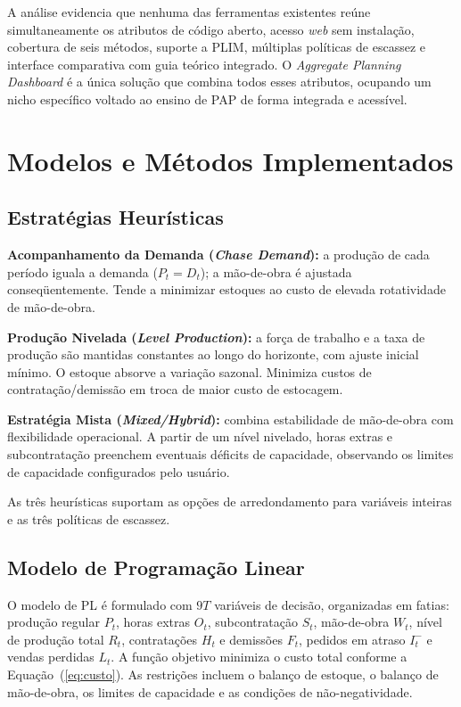 \documentclass[a4paper,11pt]{article}
\begin{document}
A análise evidencia que nenhuma das ferramentas existentes reúne simultaneamente os
atributos de código aberto, acesso \textit{web} sem instalação, cobertura de seis métodos,
suporte a PLIM, múltiplas políticas de escassez e interface comparativa com guia teórico
integrado. O \textit{Aggregate Planning Dashboard} é a única solução que combina todos
esses atributos, ocupando um nicho específico voltado ao ensino de PAP de forma integrada
e acessível.


\section{Modelos e Métodos Implementados}
\label{sec:modelos}

\subsection{Estratégias Heurísticas}

\textbf{Acompanhamento da Demanda (\textit{Chase Demand}):} a produção de cada período
iguala a demanda ($P_t = D_t$); a mão-de-obra é ajustada conseqüentemente. Tende a
minimizar estoques ao custo de elevada rotatividade de mão-de-obra.

\textbf{Produção Nivelada (\textit{Level Production}):} a força de trabalho e a taxa
de produção são mantidas constantes ao longo do horizonte, com ajuste inicial mínimo.
O estoque absorve a variação sazonal. Minimiza custos de contratação/demissão em troca
de maior custo de estocagem.

\textbf{Estratégia Mista (\textit{Mixed/Hybrid}):} combina estabilidade de mão-de-obra
com flexibilidade operacional. A partir de um nível nivelado, horas extras e
subcontratação preenchem eventuais déficits de capacidade, observando os limites de
capacidade configurados pelo usuário.

As três heurísticas suportam as opções de arredondamento para variáveis inteiras e as
três políticas de escassez.

\subsection{Modelo de Programação Linear}

O modelo de PL é formulado com $9T$ variáveis de decisão, organizadas em fatias:
produção regular $P_t$, horas extras $O_t$, subcontratação $S_t$, mão-de-obra $W_t$,
nível de produção total $R_t$, contratações $H_t$ e demissões $F_t$,
pedidos em atraso $I_t^{-}$ e vendas perdidas $L_t$.
A função objetivo minimiza o custo total conforme a Equação~(\ref{eq:custo}).
As restrições incluem o balanço de estoque, o balanço de mão-de-obra, os limites de
capacidade e as condições de não-negatividade.
\end{document}
